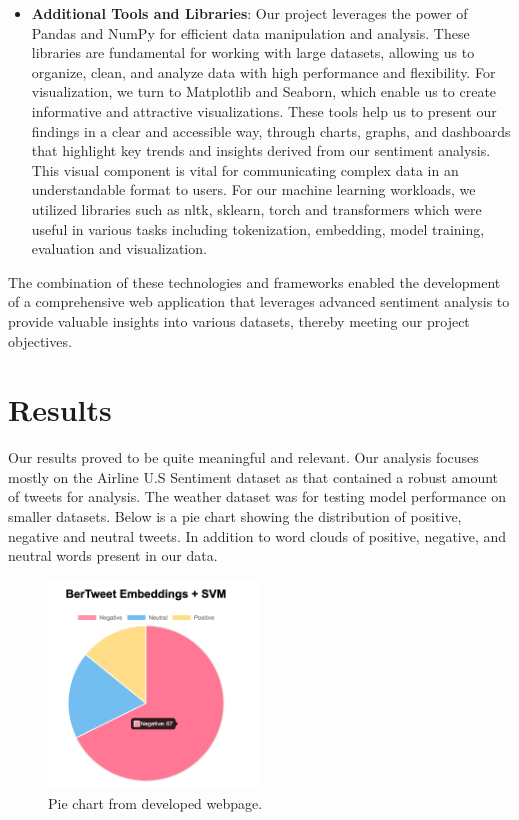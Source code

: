 \documentclass[conference]{IEEEtran}
\begin{document}
\begin{itemize}
    \item \textbf{Additional Tools and Libraries}: Our project leverages the power of Pandas and NumPy for efficient data manipulation and analysis. These libraries are fundamental for working with large datasets, allowing us to organize, clean, and analyze data with high performance and flexibility. For visualization, we turn to Matplotlib and Seaborn, which enable us to create informative and attractive visualizations. These tools help us to present our findings in a clear and accessible way, through charts, graphs, and dashboards that highlight key trends and insights derived from our sentiment analysis. This visual component is vital for communicating complex data in an understandable format to users. For our machine learning workloads, we utilized libraries such as nltk, sklearn, torch and transformers which were useful in various tasks including tokenization, embedding, model training, evaluation and visualization.
\end{itemize}
The combination of these technologies and frameworks enabled  the development of a comprehensive web application that leverages advanced sentiment analysis to provide valuable insights into various datasets, thereby meeting our project objectives.

\section{Results}
Our results proved to be quite meaningful and relevant. Our analysis focuses mostly on the Airline U.S Sentiment dataset as that contained a robust amount of tweets for analysis. The weather dataset was for testing model performance on smaller datasets. Below is a pie chart showing the distribution of positive, negative and neutral tweets. In addition to word clouds of positive, negative, and neutral words present in our data.
\begin{figure}[h!]
    \includegraphics[width=0.5\textwidth]{pie_chart.png}
    \caption{Pie chart from developed webpage.}
\end{figure}
\end{document}
